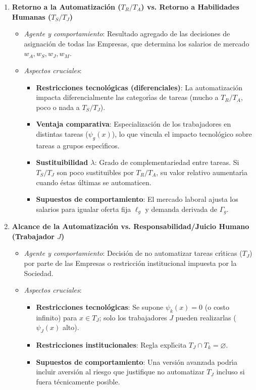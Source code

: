 \documentclass{article}
\theoremstyle{remark}
\theoremstyle{definition}
\begin{document}
\begin{enumerate}
\begin{tcolorbox}[title= Soluci\'on 2]
\begin{enumerate}
              \item \textbf{Retorno a la Automatizaci\'on ($T_R/T_A$) vs. Retorno a Habilidades Humanas ($T_S/T_J$)}
              \begin{itemize}
                \item \emph{Agente y comportamiento}: Resultado agregado de las decisiones de asignaci\'on de todas las Empresas, que determina los salarios de mercado $w_A, w_S, w_J, w_M$.
                \item \emph{Aspectos cruciales}:
                  \begin{itemize}
                    \item \textbf{Restricciones tecnol\'ogicas (diferenciales)}: La automatizaci\'on impacta diferencialmente las categor\'\i as de tareas (mucho a $T_R/T_A$, poco o nada a $T_S/T_J$).
                    \item \textbf{Ventaja comparativa}: Especializaci\'on de los trabajadores en distintas tareas ($\psi_g(x)$), lo que vincula el impacto tecnol\'ogico sobre tareas a grupos espec\'\i ficos.
                    \item \textbf{Sustituibilidad $\lambda$}: Grado de complementariedad entre tareas. Si $T_S/T_J$ son poco sustituibles por $T_R/T_A$, su valor relativo aumentar\'\i a cuando \'estas \'ultimas se automaticen.
                    \item \textbf{Supuestos de comportamiento}: El mercado laboral ajusta los salarios para igualar oferta fija $\ell_g$ y demanda derivada de $\Gamma_g$.
                  \end{itemize}
              \end{itemize}
            
              \item \textbf{Alcance de la Automatizaci\'on vs. Responsabilidad/Juicio Humano (Trabajador $J$)}
              \begin{itemize}
                \item \emph{Agente y comportamiento}: Decisi\'on de no automatizar tareas cr\'\i ticas ($T_J$) por parte de las Empresas o restricci\'on institucional impuesta por la Sociedad.
                \item \emph{Aspectos cruciales}:
                  \begin{itemize}
                    \item \textbf{Restricciones tecnol\'ogicas}: Se supone $\psi_k(x)=0$ (o costo infinito) para $x\in T_J$; solo los trabajadores $J$ pueden realizarlas ($\psi_J(x)$ alto).
                    \item \textbf{Restricciones institucionales}: Regla expl\'\i cita $T_J\cap T_k=\varnothing$.
                    \item \textbf{Supuestos de comportamiento}: Una versi\'on avanzada podr\'\i a incluir aversi\'on al riesgo que justifique no automatizar $T_J$ incluso si fuera t\'ecnicamente posible.
                  \end{itemize}
              \end{itemize}
            \end{enumerate}
            

\end{tcolorbox}
\end{enumerate}
\end{document}
